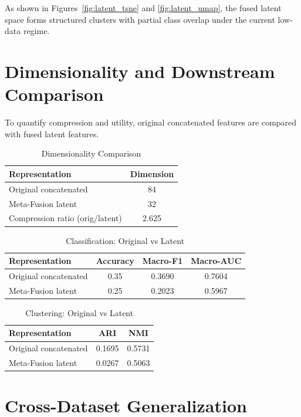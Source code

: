 \documentclass[conference]{IEEEtran}
\begin{document}
As shown in Figures~\ref{fig:latent_tsne} and \ref{fig:latent_umap}, the fused latent space forms structured clusters with partial class overlap under the current low-data regime.

\section{Dimensionality and Downstream Comparison}

To quantify compression and utility, original concatenated features are compared with fused latent features.

\begin{table}[h]
\centering
\caption{Dimensionality Comparison}
\begin{tabular}{lc}
\toprule
Representation & Dimension \\
\midrule
Original concatenated & 84 \\
Meta-Fusion latent & 32 \\
Compression ratio (orig/latent) & 2.625 \\
\bottomrule
\end{tabular}
\end{table}

\begin{table}[h]
\centering
\caption{Classification: Original vs Latent}
\begin{tabular}{lccc}
\toprule
Representation & Accuracy & Macro-F1 & Macro-AUC \\
\midrule
Original concatenated & 0.35 & 0.3690 & 0.7604 \\
Meta-Fusion latent & 0.25 & 0.2023 & 0.5967 \\
\bottomrule
\end{tabular}
\end{table}

\begin{table}[h]
\centering
\caption{Clustering: Original vs Latent}
\begin{tabular}{lcc}
\toprule
Representation & ARI & NMI \\
\midrule
Original concatenated & 0.1695 & 0.5731 \\
Meta-Fusion latent & 0.0267 & 0.5063 \\
\bottomrule
\end{tabular}
\end{table}

\section{Cross-Dataset Generalization}
\end{document}
